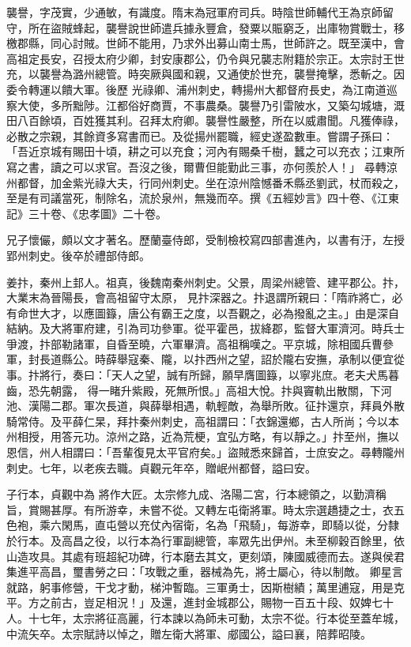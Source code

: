 \begin{pinyinscope}
 襲譽，字茂實，少通敏，有識度。隋末為冠軍府司兵。時陰世師輔代王為京師留守，所在盜賊蜂起，襲譽說世師遣兵據永豐倉，發粟以賑窮乏，出庫物賞戰士，移檄郡縣，同心討賊。世師不能用，乃求外出募山南士馬，世師許之。既至漢中，會高祖定長安，召授太府少卿，封安康郡公，仍令與兄襲志附籍於宗正。太宗討王世充，以襲譽為潞州總管。時突厥與國和親，又通使於世充，襲譽掩擊，悉斬之。因委令轉運以饋大軍。後歷
 光祿卿、浦州刺史，轉揚州大都督府長史，為江南道巡察大使，多所黜陟。江都俗好商賈，不事農桑。襲譽乃引雷陂水，又築勾城塘，溉田八百餘頃，百姓獲其利。召拜太府卿。襲譽性嚴整，所在以威肅聞。凡獲俸祿，必散之宗親，其餘資多寫書而已。及從揚州罷職，經史遂盈數車。嘗謂子孫曰：「吾近京城有賜田十頃，耕之可以充食；河內有賜桑千樹，蠶之可以充衣；江東所寫之書，讀之可以求官。吾沒之後，爾曹但能勤此三事，亦何羨於人！」
 尋轉涼州都督，加金紫光祿大夫，行同州刺史。坐在涼州陰憾番禾縣丞劉武，杖而殺之，至是有司議當死，制除名，流於泉州，無幾而卒。撰《五經妙言》四十卷、《江東記》三十卷、《忠孝圖》二十卷。



 兄子懷儼，頗以文才著名。歷蘭臺侍郎，受制檢校寫四部書進內，以書有汙，左授郢州刺史。後卒於禮部侍郎。



 姜抃，秦州上邽人。祖真，後魏南秦州刺史。父景，周梁州總管、建平郡公。抃，大業末為晉陽長，會高祖留守太原，
 見抃深器之。抃退謂所親曰：「隋祚將亡，必有命世大才，以應圖籙，唐公有霸王之度，以吾觀之，必為撥亂之主。」由是深自結納。及大將軍府建，引為司功參軍。從平霍邑，拔絳郡，監督大軍濟河。時兵士爭渡，抃部勒諸軍，自昏至曉，六軍畢濟。高祖稱嘆之。平京城，除相國兵曹參軍，封長道縣公。時薛舉寇秦、隴，以抃西州之望，詔於隴右安撫，承制以便宜從事。抃將行，奏曰：「天人之望，誠有所歸，願早膺圖籙，以寧兆庶。老夫犬馬暮齒，恐先朝露，
 得一睹升紫殿，死無所恨。」高祖大悅。抃與竇軌出散關，下河池、漢陽二郡。軍次長道，與薛舉相遇，軌輕敵，為舉所敗。征抃還京，拜員外散騎常侍。及平薛仁杲，拜抃秦州刺史，高祖謂曰：「衣錦還鄉，古人所尚；今以本州相授，用答元功。涼州之路，近為荒梗，宜弘方略，有以靜之。」抃至州，撫以恩信，州人相謂曰：「吾輩復見太平官府矣。」盜賊悉來歸首，士庶安之。尋轉隴州刺史。七年，以老疾去職。貞觀元年卒，贈岷州都督，謚曰安。



 子行本，貞觀中為
 將作大匠。太宗修九成、洛陽二宮，行本總領之，以勤濟稱旨，賞賜甚厚。有所游幸，未嘗不從。又轉左屯衛將軍。時太宗選趫捷之士，衣五色袍，乘六閑馬，直屯營以充仗內宿衛，名為「飛騎」，每游幸，即騎以從，分隸於行本。及高昌之役，以行本為行軍副總管，率眾先出伊州。未至柳穀百餘里，依山造攻具。其處有班超紀功碑，行本磨去其文，更刻頌，陳國威德而去。遂與侯君集進平高昌，璽書勞之曰：「攻戰之重，器械為先，將士屬心，待以制敵。
 卿星言就路，躬事修營，干戈才動，梯沖暫臨。三軍勇士，因斯樹績；萬里逋寇，用是克平。方之前古，豈足相況！」及還，進封金城郡公，賜物一百五十段、奴婢七十人。十七年，太宗將征高麗，行本諫以為師未可動，太宗不從。行本從至蓋牟城，中流矢卒。太宗賦詩以悼之，贈左衛大將軍、郕國公，謚曰襄，陪葬昭陵。




\end{pinyinscope}
